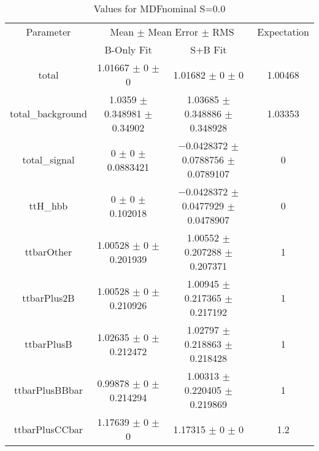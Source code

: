 \begin{table}
\centering
\caption{Values for MDFnominal S=0.0}
\begin{tabular}{cccc}
\toprule
Parameter & \multicolumn{2}{c}{Mean $\pm$ Mean Error $\pm$ RMS} & Expectation\\
 & B-Only Fit & S+B Fit & \\
\midrule
total & \num{1.01667} $\pm$ \num{0} $\pm$ \num{0} & \num{1.01682} $\pm$ \num{0} $\pm$ \num{0} & \num{1.00468}\\
total\_background & \num{1.0359} $\pm$ \num{0.348981} $\pm$ \num{0.34902} & \num{1.03685} $\pm$ \num{0.348886} $\pm$ \num{0.348928} & \num{1.03353}\\
total\_signal & \num{0} $\pm$ \num{0} $\pm$ \num{0.0883421} & \num{-0.0428372} $\pm$ \num{0.0788756} $\pm$ \num{0.0789107} & \num{0}\\
ttH\_hbb & \num{0} $\pm$ \num{0} $\pm$ \num{0.102018} & \num{-0.0428372} $\pm$ \num{0.0477929} $\pm$ \num{0.0478907} & \num{0}\\
ttbarOther & \num{1.00528} $\pm$ \num{0} $\pm$ \num{0.201939} & \num{1.00552} $\pm$ \num{0.207288} $\pm$ \num{0.207371} & \num{1}\\
ttbarPlus2B & \num{1.00528} $\pm$ \num{0} $\pm$ \num{0.210926} & \num{1.00945} $\pm$ \num{0.217365} $\pm$ \num{0.217192} & \num{1}\\
ttbarPlusB & \num{1.02635} $\pm$ \num{0} $\pm$ \num{0.212472} & \num{1.02797} $\pm$ \num{0.218863} $\pm$ \num{0.218428} & \num{1}\\
ttbarPlusBBbar & \num{0.99878} $\pm$ \num{0} $\pm$ \num{0.214294} & \num{1.00313} $\pm$ \num{0.220405} $\pm$ \num{0.219869} & \num{1}\\
ttbarPlusCCbar & \num{1.17639} $\pm$ \num{0} $\pm$ \num{0} & \num{1.17315} $\pm$ \num{0} $\pm$ \num{0} & \num{1.2}\\
\bottomrule
\end{tabular}
\end{table}